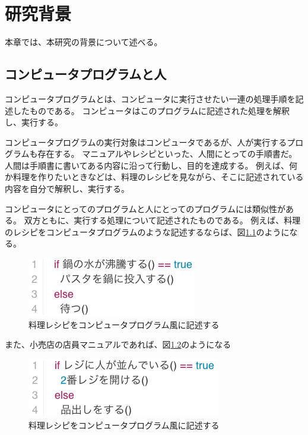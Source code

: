 \chapter{研究背景}\label{chap:background}

本章では、本研究の背景について述べる。

\section{コンピュータプログラムと人}\label{ux30b3ux30f3ux30d4ux30e5ux30fcux30bfux30d7ux30edux30b0ux30e9ux30e0ux3068ux4eba}

コンピュータプログラムとは、コンピュータに実行させたい一連の処理手順を記述したものである。
コンピュータはこのプログラムに記述された処理を解釈し、実行する。

コンピュータプログラムの実行対象はコンピュータであるが、人が実行するプログラムも存在する。
マニュアルやレシピといった、人間にとっての手順書だ。
人間は手順書に書いてある内容に沿って行動し、目的を達成する。
例えば、何か料理を作りたいときなどは、料理のレシピを見ながら、そこに記述されている内容を自分で解釈し、実行する。

コンピュータにとってのプログラムと人にとってのプログラムには類似性がある。
双方ともに、実行する処理について記述されたものである。
例えば、料理のレシピをコンピュータプログラムのような記述するならば、図\ref{fig:background_cooking}のようになる。

\begin{figure}[htbp]
  \begin{center}
  \includegraphics[width=.4\linewidth,bb=0 0 281 98]{images/background_cooking.js.png}
  \end{center}
  \caption{料理レシピをコンピュータプログラム風に記述する}
  \label{fig:background_cooking}
\end{figure}

また、小売店の店員マニュアルであれば、図\ref{fig:background_retail}のようになる

\begin{figure}[htbp]
  \begin{center}
  \includegraphics[width=.4\linewidth,bb=0 0 319 98]{images/background_retail.js.png}
  \end{center}
  \caption{料理レシピをコンピュータプログラム風に記述する}
  \label{fig:background_retail}
\end{figure}

